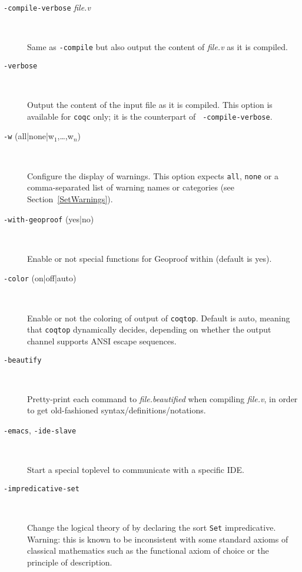 \begin{description}
\item[{\tt -compile-verbose} {\em file.v}]\ %

  Same as {\tt -compile} but also output the content of {\em file.v} as
  it is compiled.

\item[{\tt -verbose}]\ %

  Output the content of the input file as it is compiled. This option is
  available for {\tt coqc} only; it is the counterpart of {\tt
    -compile-verbose}.

  \item[{\tt -w} (all|none|w$_1$,\ldots,w$_n$)]\ %

  Configure the display of warnings. This option expects {\tt all}, {\tt none}
  or a comma-separated list of warning names or categories (see
  Section~\ref{SetWarnings}).

%

\item[{\tt -with-geoproof} (yes|no)]\ %

  Enable or not special functions for Geoproof within {\CoqIDE} (default
  is yes).

\item[{\tt -color} (on|off|auto)]\ %

  Enable or not the coloring of output of {\tt coqtop}. Default is auto,
  meaning that {\tt coqtop} dynamically decides, depending on whether the
  output channel supports ANSI escape sequences.

\item[{\tt -beautify}]\ %

  Pretty-print each command to {\em file.beautified} when compiling {\em
    file.v}, in order to get old-fashioned syntax/definitions/notations.

\item[{\tt -emacs}, {\tt -ide-slave}]\ %

  Start a special toplevel to communicate with a specific IDE.

\item[{\tt -impredicative-set}]\ %

  Change the logical theory of {\Coq} by declaring the sort {\tt Set}
  impredicative. Warning: this is known to be inconsistent with
  some standard axioms of classical mathematics such as the functional
  axiom of choice or the principle of description.


\end{description}
